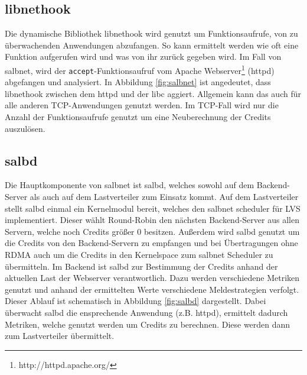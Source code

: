 \documentclass[a4paper, 12pt, BCOR10mm, DIV12, toc=bibliography, toc=listof, german]{scrbook}
\begin{document}
		
		\subsection*{libnethook} %

			Die dynamische Bibliothek libnethook wird genutzt um Funktionsaufrufe, von zu überwachenden
			Anwendungen abzufangen. So kann ermittelt werden wie oft eine Funktion aufgerufen wird und was
			von ihr zurück gegeben wird. Im Fall von salbnet, wird der \texttt{accept}-Funktionsaufruf vom
			Apache Webserver\footnote{http://httpd.apache.org/} (httpd) abgefangen und analysiert. In
			Abbildung \ref{fig:salbnet} ist angedeutet, dass libnethook zwischen dem httpd und der libc
			aggiert. Allgemein kann das auch für alle anderen TCP-Anwendungen genutzt werden. Im TCP-Fall
			wird nur die Anzahl der Funktionsaufrufe genutzt um eine Neuberechnung der Credits auszulösen.



		\subsection*{salbd} %

			Die Hauptkomponente von salbnet ist salbd, welches sowohl auf dem Backend-Server als auch auf
			dem Lastverteiler zum Einsatz kommt. Auf dem Lastverteiler stellt salbd einmal ein Kernelmodul
			bereit, welches den salbnet scheduler für LVS implementiert. Dieser wählt Round-Robin den
			nächsten Backend-Server aus allen Servern, welche noch Credits größer 0 besitzen. Außerdem
			wird salbd genutzt um die Credits von den Backend-Servern zu empfangen und bei Übertragungen
			ohne RDMA auch um die Credits in den Kernelspace zum salbnet Scheduler zu übermitteln.  Im
			Backend ist salbd zur Bestimmung der Credits anhand der aktuellen Last der Webserver
			verantwortlich. Dazu werden verschiedene Metriken genutzt und anhand der ermittelten Werte
			verschiedene Meldestrategien verfolgt. Dieser Ablauf ist schematisch in Abbildung
			\ref{fig:salbd} dargestellt. Dabei überwacht salbd die ensprechende Anwendung (z.B.
			httpd), ermittelt dadurch Metriken, welche genutzt werden um Credits zu berechnen. Diese
			werden dann zum Lastverteiler übermittelt.

\end{document}
